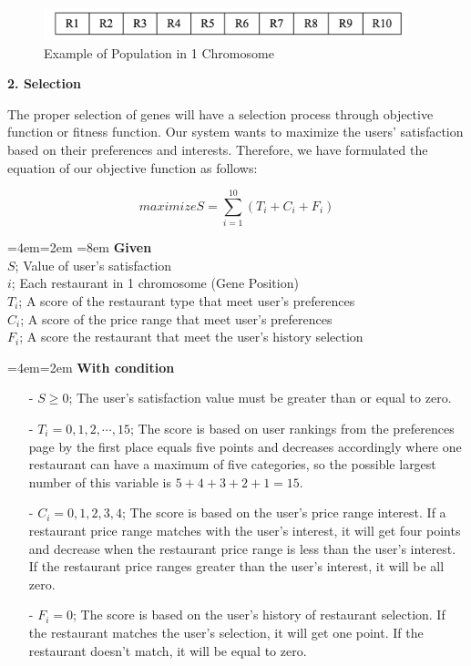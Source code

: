 \documentclass[12pt,oneside,openright,a4paper]{cpe-english-project}
\newenvironment{blockquote}{%
  \par%
  \medskip
  \leftskip=4em\rightskip=2em%
  \noindent\ignorespaces}{%
  \par\medskip}
\begin{document}
\begin{figure}[H]\centering
\includegraphics[width=300pt]{./images/3ga_init.png}
\caption{Example of Population in 1 Chromosome}\label{fig:3ga_init}
\end{figure}

\textbf{2. Selection}\par

The proper selection of genes will have a selection process through objective function or fitness function. Our system wants to maximize the users’ satisfaction based on their preferences and interests. Therefore, we have formulated the equation of our objective function as follows:

\begin{equation}\label{eq:maximizes}
maximize S = \sum_{i=1}^{10}(T_i + C_i + F_i)
\end{equation}

\begin{blockquote}\leftskip=8em
\textbf{Given}\\
$S$; Value of user’s satisfaction\\
$i$; Each restaurant in 1 chromosome (Gene Position)\\
$T_i$; A score of the restaurant type that meet user’s preferences\\
$C_i$; A score of the price range that meet user’s preferences\\
$F_i$; A score  the restaurant that meet the user’s history selection

\end{blockquote}


\begin{blockquote}
\textbf{With condition}
\vspace{-12pt}
\begin{itemize}\leftskip=2em
\item[-] $S \geq 0$; The user’s satisfaction value must be greater than or equal to zero.
\item[-] $T_i=0, 1, 2, \cdots, 15$; The score is based on user rankings from the preferences page by the first place equals five points and decreases accordingly where one restaurant can have a maximum of five categories, so the possible largest number of this variable is $5 + 4 + 3 + 2 + 1 = 15$.
\item[-] $C_i=0,1,2,3,4$; The score is based on the user’s price range interest. If a restaurant price range matches with the user’s interest, it will get four points and decrease when the restaurant price range is less than the user's interest. If the restaurant price ranges greater than the user's interest, it will be all zero.
\item[-] $F_i=0$; The score is based on the user’s history of restaurant selection. If the restaurant matches the user’s selection, it will get one point. If the restaurant doesn’t match, it will be equal to zero.
\end{itemize}
\end{blockquote}
\end{document}
